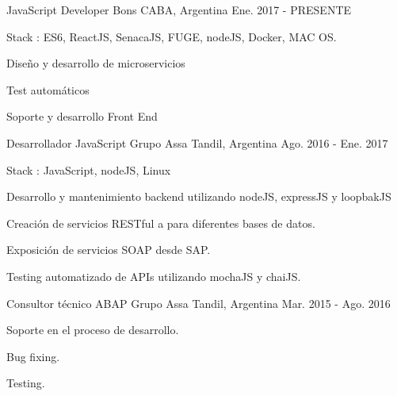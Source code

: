 \begin{cventries}
\cventry
{JavaScript Developer} %
{Bons} %
{CABA, Argentina} %
{Ene. 2017 - PRESENTE} %
{ %
\begin{cvitems}
\item {Stack : ES6, ReactJS, SenacaJS, FUGE, nodeJS, Docker, MAC OS.}
\item {Diseño y desarrollo de microservicios}
\item {Test automáticos}
\item {Soporte y desarrollo Front End}
\end{cvitems}
}
\cventry
{Desarrollador JavaScript} %
{Grupo Assa} %
{Tandil, Argentina} %
{Ago. 2016 - Ene. 2017} %
{ %
\begin{cvitems}
\item {Stack : JavaScript, nodeJS, Linux}
\item {Desarrollo y mantenimiento backend utilizando nodeJS, expressJS y loopbakJS}
\item {Creación de servicios RESTful a para diferentes bases de datos.}
\item {Exposición de servicios SOAP desde SAP.}
\item {Testing automatizado de APIs utilizando mochaJS y chaiJS.}
\end{cvitems}
}
\cventry
{Consultor técnico ABAP} %
{Grupo Assa} %
{Tandil, Argentina} %
{Mar. 2015 - Ago. 2016} %
{ %
\begin{cvitems}
\item {Soporte en el proceso de desarrollo.}
\item {Bug fixing.}
\item {Testing.}
\end{cvitems}
}
\end{cventries}
